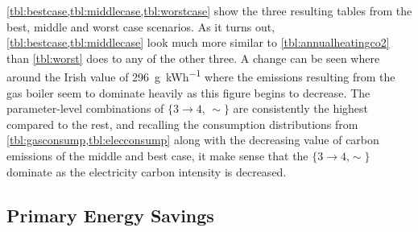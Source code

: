 \cref{tbl:bestcase,tbl:middlecase,tbl:worstcase} show the three resulting tables from the best, middle and worst case scenarios. As it turns out, \cref{tbl:bestcase,tbl:middlecase} look much more similar to \cref{tbl:annualheatingco2} than \cref{tbl:worst} does to any of the other three. A change can be seen where around the Irish value of \qty{296}{\gram\per\kWh} where the emissions resulting from the gas boiler seem to dominate heavily as this figure begins to decrease. The parameter-level combinations of $\{3\rightarrow4\text{, }\sim\}$ are consistently the highest compared to the rest, and recalling the consumption distributions from \cref{tbl:gasconsump,tbl:elecconsump} along with the decreasing value of carbon emissions of the middle and best case, it make sense that the $\{3\rightarrow4\text{,}\sim\}$ dominate as the electricity carbon intensity is decreased.


\subsection{Primary Energy Savings}